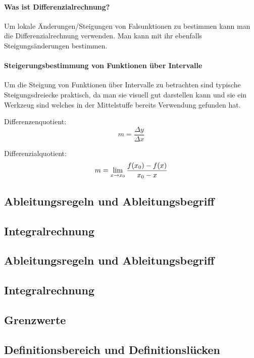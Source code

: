 \documentclass{article}
\begin{document}
		\paragraph{Was ist Differenzialrechnung?}
			Um lokale Änderungen/Steigungen von Falsunktionen zu bestimmen kann man die Differenzialrechnung verwenden.
			Man kann mit ihr ebenfalls Steigungsänderungen bestimmen.
			
		\paragraph{Steigerungsbestimmung von Funktionen über Intervalle}
	
			Um die Steigung von Funktionen über Intervalle zu betrachten sind typische Steigungsdreiecke praktisch,
			da man sie visuell gut darstellen kann und sie ein Werkzeug sind welches in der Mittelstuffe bereits
			Verwendung gefunden hat.
			
			Differenzenquotient:
			\[
			    m = {\frac {\Delta y} {\Delta x}}
			\]
			
			Differenzialquotient:
			\[
			    m = \lim_{x \to x_{0}} {{f(x_{0}) - f(x)} \over { x_{0} - x}}
			\]


	\subsection{Ableitungsregeln und Ableitungsbegriff}\label{Ableitungen}
	
	\subsection{Integralrechnung}\label{Integralrechnung}
	\subsection{Ableitungsregeln und Ableitungsbegriff}\label{Ableitungen}
	\subsection{Integralrechnung}\label{Integralrechnung}
	\subsection{Grenzwerte}
	\subsection{Definitionsbereich und Definitionslücken}\label{Definitionsbereich}
\end{document}
